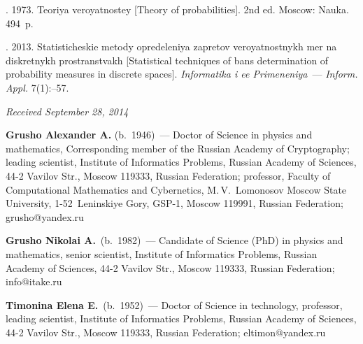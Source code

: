 \begin{multicols}{2}
{{\begin{thebibliography}{9}
\smallskip

. 1973. Teoriya veroyatnostey
[Theory of probabilities]. 2nd ed. Moscow: Nauka. 494~p.

\smallskip

.  2013. Sta\-ti\-sti\-che\-skie
metody opredeleniya zapretov veroyatnostnykh mer na diskretnykh
prostranstvakh [Statistical techniques of bans determination
of probability measures in discrete spaces].
\textit{Informatika i ee Primeneniya}~--- \textit{Inform. Appl.} 7(1):--57.
\end{thebibliography}

 }
 }

\end{multicols}

\vspace*{-6pt}

\hfill{\small\textit{Received September 28, 2014}}

\vspace*{-18pt}

    \Contr

\noindent
\textbf{Grusho Alexander A.} (b.\ 1946)~---
Doctor of Science in physics and mathematics, Corresponding member of the Russian Academy
of Cryptography; leading scientist, Institute of Informatics Problems, Russian Academy of
Sciences, 44-2 Vavilov Str., Moscow 119333, Russian Federation; professor, Faculty of
Computational Mathematics and Cybernetics, M.\,V.~Lomonosov Moscow State University,
1-52~Leninskiye Gory, GSP-1, Moscow 119991, Russian Federation; grusho@yandex.ru

\vspace*{3pt}

\noindent
\textbf{Grusho Nikolai A.}\ (b.\ 1982)~---
Candidate of Science (PhD) in physics and mathematics, senior scientist, Institute of Informatics
Problems, Russian Academy of Sciences, 44-2 Vavilov Str., Moscow 119333, Russian
Federation; info@itake.ru


\vspace*{3pt}

\noindent
\textbf{Timonina Elena E.}\ (b.\ 1952)~---
Doctor of Science in technology, professor, leading scientist, Institute of Informatics Problems,
Russian Academy of Sciences, 44-2 Vavilov Str., Moscow 119333, Russian Federation;
eltimon@yandex.ru

\label{end\stat}

\renewcommand{\bibname}{\protect\rm Литература}
